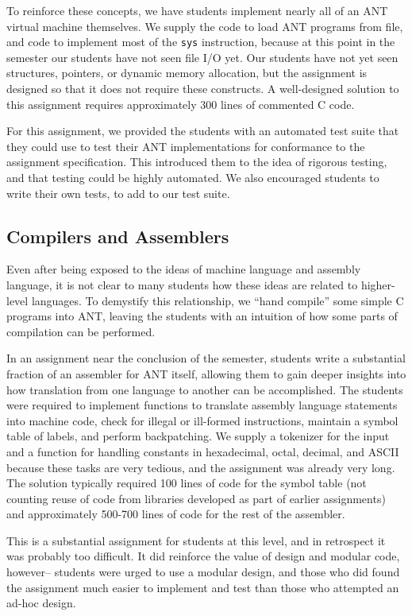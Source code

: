 To reinforce these concepts, we have students implement nearly all of
an ANT virtual machine themselves.  We supply the code to load ANT
programs from file, and code to implement most of the {\tt sys}
instruction, because at this point in the semester our students have
not seen file I/O yet.  Our students have not yet seen structures,
pointers, or dynamic memory allocation, but the assignment is designed
so that it does not require these constructs.
A well-designed solution to this assignment requires approximately 300
lines of commented C code.

For this assignment, we provided the students with an automated test
suite that they could use to test their ANT implementations for
conformance to the assignment specification.  This introduced them to
the idea of rigorous testing, and that testing could be highly
automated.  We also encouraged students to write their own tests, to add
to our test suite.

\subsection{Compilers and Assemblers}

Even after being exposed to the ideas of machine language and assembly
language, it is not clear to many students how these ideas are related
to higher-level languages.  To demystify this relationship, we ``hand
compile'' some simple C programs into ANT, leaving the students with
an intuition of how some parts of compilation can be performed.

In an assignment near the conclusion of the semester, students write a
substantial fraction of an assembler for ANT itself, allowing them to
gain deeper insights into how translation from one language to
another can be accomplished.  The students were required to implement
functions to translate
assembly language statements into machine code, check for illegal or
ill-formed instructions, maintain a symbol table of labels, and
perform backpatching.  We supply a tokenizer for the input and a
function for handling constants in hexadecimal, octal, decimal, and ASCII
because these tasks are very tedious, and the assignment was already
very long.  The solution typically required 100 lines of code for
the symbol table (not counting reuse of code from libraries
developed as part of earlier assignments) and approximately 500-700
lines of code for the rest of the assembler.

This is a substantial assignment for students at this level, and in
retrospect it was probably too difficult.  It did reinforce
the value of design and modular code, however-- students were urged to
use a modular design, and those who did found the assignment much
easier to implement and test than those who attempted an ad-hoc
design.

